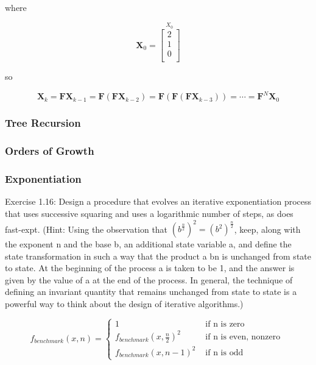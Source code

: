 where

\begin{equation}
\mathbf{X}_0 = 
\stackrel{\mbox{$X_{0}$}}{
\left[ \begin{array}{c}
2 \\
1 \\
0 \\
\end{array} \right]
}
\label{eq:ss_x0}
\end{equation}

so

\begin{equation}
\mathbf{X}_k 
= \mathbf{F}\mathbf{X}_{k-1}
= \mathbf{F} \left( \mathbf{F}\mathbf{X}_{k-2} \right)
= \mathbf{F} \left( \mathbf{F} \left( \mathbf{F}\mathbf{X}_{k-3} \right) \right)
= \cdots
= \mathbf{F}^N \mathbf{X}_0
\label{eq:ss_rep_expanded}
\end{equation}

            \subsubsection{Tree Recursion}
            \subsubsection{Orders of Growth}
            \subsubsection{Exponentiation}
Exercise 1.16:  Design a procedure that evolves an iterative exponentiation process that uses successive squaring and uses a logarithmic number of steps, as does fast-expt.  (Hint: Using the observation that $\left(b^{\frac{n}{2}}\right)^2 = \left(b^2\right)^{\frac{n}{2}}$, keep, along with the exponent n and the base b, an additional state variable a, and define the state transformation in such a way that the product a bn is unchanged from state to state. At the beginning of the process a is taken to be 1, and the answer is given by the value of a at the end of the process. In general, the technique of defining an invariant quantity that remains unchanged from state to state is a powerful way to think about the design of iterative algorithms.)

\begin{equation}
f_{benchmark}\left(x,n\right) =
\begin{cases}
1 & \mbox{ if n is zero } \\
f_{benchmark}\left(x,\frac{n}{2}\right)^{2} & \mbox{ if n is even, nonzero } \\
f_{benchmark}\left(x,n-1\right)^{2} & \mbox{ if n is odd }
\end{cases}
\label{eq:fast_expt_benchmark}
\end{equation}

